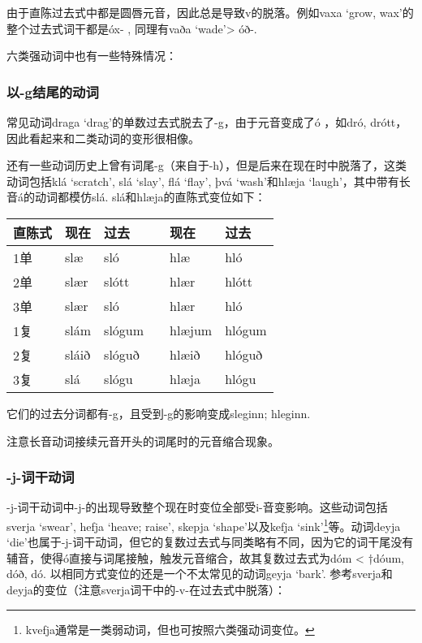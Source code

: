 由于直陈过去式中都是圆唇元音，因此总是导致v的脱落。例如vaxa `grow, wax‌'的整个过去式词干都是óx- , 同理有vaða `wade‌'> óð-.

六类强动词中也有一些特殊情况：


\subsubsection{以-g结尾的动词}

常见动词draga `drag‌'的单数过去式脱去了-g，由于元音变成了ó ，如dró,
drótt，因此看起来和二类动词的变形很相像。

还有一些动词历史上曾有词尾-g（来自于-h），但是后来在现在时中脱落了，这类动词包括klá `scratch', slá `slay', flá `flay', þvá `wash'和hlæja
`laugh‌'，其中带有长音á的动词都模仿slá. slá和hlæja的直陈式变位如下：

\begin{longtable}{llllll}
    \toprule
    直陈式 & 现在    & 过去     &  & 现在     & 过去     \\
    \midrule
    \endhead
    \bottomrule
    \endfoot
    1单  & slæ   & sló    &  & hlæ    & hló    \\
    2单  & slær  & slótt  &  & hlær   & hlótt  \\
    3单  & slær  & sló    &  & hlær   & hló    \\
    1复  & slám  & slógum &  & hlæjum & hlógum \\
    2复  & sláið & slóguð &  & hlæið  & hlóguð \\
    3复  & slá   & slógu  &  & hlæja  & hlógu  \\
\end{longtable}

它们的过去分词都有-g，且受到-g的影响变成sleginn; hleginn.

注意长音动词接续元音开头的词尾时的元音缩合现象。


\subsubsection{-j-词干动词}

-j-词干动词中-j-的出现导致整个现在时变位全部受i-音变影响。这些动词包括sverja `swear', hefja `heave; raise', skepja `shape'以及kefja
`sink'\footnote{kvefja通常是一类弱动词，但也可按照六类强动词变位。}等。动词deyja `die'也属于-j-词干动词，但它的复数过去式与同类略有不同，因为它的词干尾没有辅音，使得ó直接与词尾接触，触发元音缩合，故其复数过去式为dóm < †dóum, dóð, dó. 以相同方式变位的还是一个不太常见的动词geyja `bark'. 参考sverja和deyja的变位（注意sverja词干中的-v-在过去式中脱落）：

